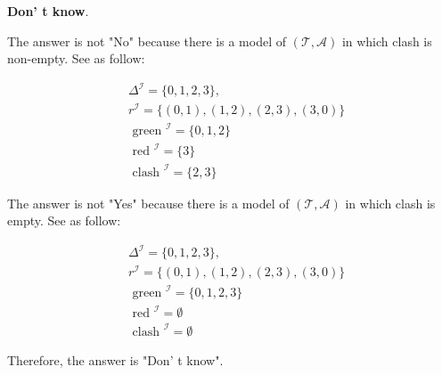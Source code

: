 \documentclass[12pt]{article}
\def \T {\mathcal{T}}
\def \A {\mathcal{A}}
\begin{document}
    \textbf{Don' t know}.
    \par
    The answer is not "No" because there is a model of $(\T, \A)$ in which clash is non-empty. See as follow: \par
    $$
    \begin{aligned}
    & \Delta^{\mathcal{I}}=\{0,1,2,3\}, \\
    & r^{\mathcal{I}}=\{(0,1),(1,2),(2,3),(3,0)\} \\
    & \text { green }{ }^{\mathcal{I}}=\{0,1,2\} \\
    & \text { red }^{\mathcal{I}}=\{3\} \\
    & \text { clash }^{\mathcal{I}}=\{2, 3\}
    \end{aligned}
    $$ \par
    The answer is not "Yes" because there is a model of $(\T, \A)$ in which clash is empty. See as follow: \par
    $$
    \begin{aligned}
    & \Delta^{\mathcal{I}}=\{0,1,2,3\}, \\
    & r^{\mathcal{I}}=\{(0,1),(1,2),(2,3),(3,0)\} \\
    & \text { green }{ }^{\mathcal{I}}=\{0,1,2,3\} \\
    & \text { red }^{\mathcal{I}}=\emptyset \\
    & \text { clash }^{\mathcal{I}}=\emptyset
    \end{aligned}
    $$ \par
    Therefore, the answer is "Don' t know".
    

    \newpage
\end{document}
